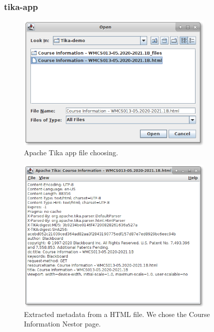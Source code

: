 \documentclass{article}
\begin{document}
\subsubsection{tika-app}
\begin{figure}[ht]
    \centering
    \includegraphics[width=0.85\textwidth]{report/images/tika_app/filechooser.png}
    \caption{Apache Tika app file choosing.}
    \label{fig:tika_app/filechooser}
\end{figure}
\begin{figure}[ht]
    \centering
    \includegraphics[width=0.85\textwidth]{report/images/tika_app/metadata.png}
    \caption{Extracted metadata from a HTML file. We chose the Course Information Nestor page.}
    \label{fig:tika_app/metadata}
\end{figure}
\end{document}
